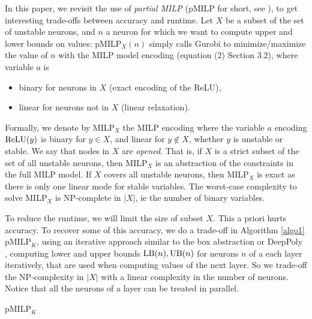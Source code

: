 {\color{red}
In this paper, we revisit the use of {\em partial MILP} (pMILP for short, see \cite{DivideAndSlide}), to get interesting trade-offs between accuracy and runtime.
Let $X$ be a subset of the set of unstable neurons, and $n$ a neuron for which we want to compute upper and lower bounds on values: pMILP$_X(n)$ simply calls Gurobi to minimize/maximize the value of $n$ with the MILP model encoding (equation (2) Section 3.2), where variable $a$ is
\begin{itemize}
\item binary for neurons in $X$ (exact encoding of the ReLU),
\item linear for neurons not in $X$ (linear relaxation).
\end{itemize}


Formally, we denote by MILP$_X$ the MILP encoding where the variable $a$ encoding $\mathrm{ReLU}(y)$ is binary for $y\in X$, and linear for $y\notin X$, whether $y$ is unstable or stable. 
We say that nodes in $X$ are {\em opened}. 
That is, if $X$ is a strict subset of the set of all unstable neurons, then 
MILP$_X$ is an abstraction of the constraints in the full MILP model. If $X$ covers all unstable neurons, then MILP$_X$ is exact as there is only one linear mode for stable variables. The worst-case complexity to solve MILP$_X$ is NP-complete in $|X|$, ie the number of binary variables.

\smallskip

To reduce the runtime, we will limit the size of subset $X$. This a priori hurts accuracy. To recover some of this accuracy, we do a trade-off in Algorithm \ref{algo1} pMILP$_K$, using an iterative approach similar to the box abstraction or DeepPoly \cite{deeppoly}, computing lower and upper bounds $\mathrm{LB}(n),\mathrm{UB}(n)$ for neurons $n$ of a each layer iteratively, that are used when computing values of the next layer.
So we trade-off the NP-complexity in $|X|$ with a linear complexity in the number of neurons. Notice that all the neurons of a layer can be treated in parallel.
}

\medskip




\begin{algorithm}[t!]
	\caption{pMILP$_K$}
	\label{algo1}
	
	
\end{algorithm}	

